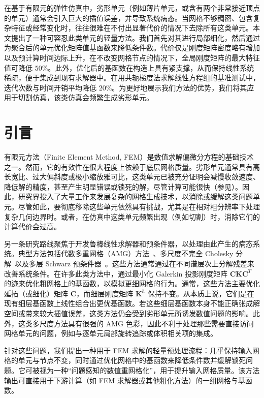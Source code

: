 在基于有限元的弹性仿真中，劣形单元（例如薄片单元，或含有两个非常接近顶点的单元）通常会引入巨大的插值误差，并导致系统病态。当网格不够稠密、包含复杂特征或经常变化时，往往很难在不付出显著代价的情况下去除所有这类单元。本文提出了一种可容忍此类单元的轻量方法。我们首先对其进行局部细化，然后通过为聚合后的单元优化矩阵值基函数来降低条件数。代价仅是刚度矩阵密度略有增加以及预计算时间边际上升，在不改变网格节点的情况下，全局刚度矩阵的最大特征值可降低 $50\%$。此外，优化后的基函数在构造上具有紧支撑，从而保持线性系统稀疏，便于集成到现有求解器中。在用共轭梯度法求解线性方程组的基准测试中，迭代次数与时间开销平均降低 $20\%$。为更好地展示我们方法的优势，我们将其应用于切割仿真，该类仿真会频繁生成劣形单元。

\section{引言}

有限元方法（Finite Element Method, FEM）是数值求解偏微分方程的基础技术之一。然而，它的有效性在很大程度上依赖于底层网格质量。劣形单元通常具有高长宽比、过大偏斜度或极小缩放雅可比，这类单元已被充分证明会减慢收敛速度、降低解的精度，甚至产生明显错误或锁死的解，尽管计算可能很快（参见）。因此，研究界投入了大量工作来发展复杂的网格生成技术，以消除或缓解这类问题单元。尽管如此，要彻底移除这些单元依然具有挑战，尤其是在相对粗分辨率下处理复杂几何边界时。或者，在仿真中这类单元频繁出现（例如切割）时，消除它们的计算代价会过高。

另一条研究路线聚焦于开发鲁棒线性求解器和预条件器，以处理由此产生的病态系统。典型方法包括代数多重网格（AMG）方法~\cite{Griebel2003amgElas}、多尺度不完全 Cholesky 分解~\cite{chen_multiscale_2021}以及多层 Schwarz 预条件器~\cite{Wu2022schwarz}。这些方法通常通过在不同谱层次上分解残差来改善系统条件。在许多此类方法中，通过最小化 Galerkin 投影刚度矩阵 $\mathbf{C} \mathbf{K} \mathbf{C}^T$ 的迹来优化粗网格上的基函数，以模拟更细网格的行为。通常，这些方法主要优化延拓（或细化）矩阵 $\mathbf{C}$，而细层刚度矩阵 $\mathbf{K}^h$ 保持不变。从本质上说，它们是在现有细层基函数上线性组合出更优基函数。若这些细层基函数本身不能正确张成解空间或带来较大插值误差，这类方法仍会受到劣形单元所诱发数值问题的影响。此外，这类多尺度方法具有很强的 AMG 色彩，因此不利于处理那些需要直接访问网格单元的问题，例如与逐单元局部旋转追踪或体积相关项的集成。

针对这些问题，我们提出一种用于 FEM 求解的轻量预处理流程：几乎保持输入网格的单元与节点不变，同时通过优化网格中的基函数来降低条件数并缓解锁死问题。它可被视为一种“问题感知的数值重网格化”，用于提升输入网格质量。该方法输出可直接用于下游计算（如 FEM 求解器或其他粗化方法）的一组网格与基函数。

